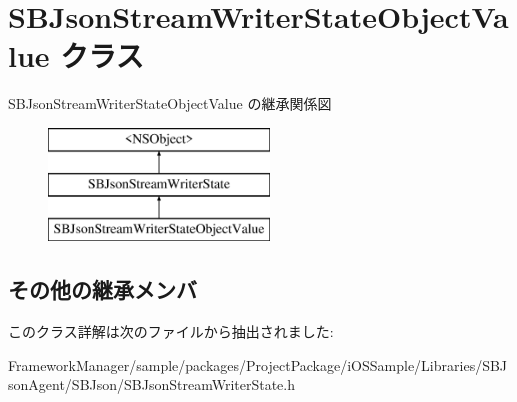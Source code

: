 \hypertarget{interface_s_b_json_stream_writer_state_object_value}{}\section{S\+B\+Json\+Stream\+Writer\+State\+Object\+Value クラス}
\label{interface_s_b_json_stream_writer_state_object_value}
S\+B\+Json\+Stream\+Writer\+State\+Object\+Value の継承関係図\begin{figure}[H]
\begin{center}
\leavevmode
\includegraphics[height=3.000000cm]{interface_s_b_json_stream_writer_state_object_value}
\end{center}
\end{figure}
\subsection*{その他の継承メンバ}


このクラス詳解は次のファイルから抽出されました\+:\begin{DoxyCompactItemize}
\item 
Framework\+Manager/sample/packages/\+Project\+Package/i\+O\+S\+Sample/\+Libraries/\+S\+B\+Json\+Agent/\+S\+B\+Json/S\+B\+Json\+Stream\+Writer\+State.\+h\end{DoxyCompactItemize}
